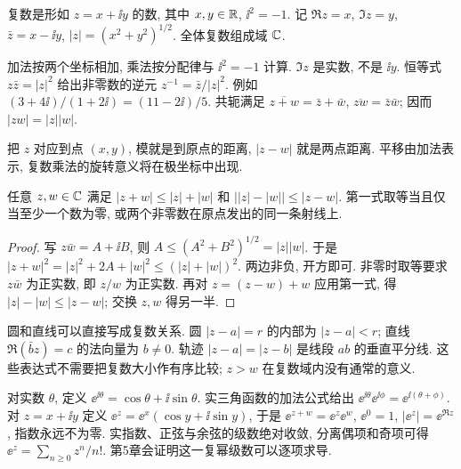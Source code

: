 \begin{definition}
复数是形如 $z=x+\ii y$ 的数, 其中 $x,y\in\mathbb R$, $\ii^2=-1$. 记 $\Re z=x$, $\Im z=y$, $\bar z=x-\ii y$, $|z|=(x^2+y^2)^{1/2}$. 全体复数组成域 $\mathbb C$.
\end{definition}
加法按两个坐标相加, 乘法按分配律与 $\ii^2=-1$ 计算. $\Im z$ 是实数, 不是 $\ii y$. 恒等式 $z\bar z=|z|^2$ 给出非零数的逆元 $z^{-1}=\bar z/|z|^2$. 例如 $(3+4\ii)/(1+2\ii)=(11-2\ii)/5$. 共轭满足 $\overline{z+w}=\bar z+\bar w$, $\overline{zw}=\bar z\bar w$; 因而 $|zw|=|z||w|$.

把 $z$ 对应到点 $(x,y)$, 模就是到原点的距离, $|z-w|$ 就是两点距离. 平移由加法表示, 复数乘法的旋转意义将在极坐标中出现.
\begin{proposition}[三角不等式]
任意 $z,w\in\mathbb C$ 满足 $|z+w|\le |z|+|w|$ 和 $\bigl||z|-|w|\bigr|\le |z-w|$. 第一式取等当且仅当至少一个数为零, 或两个非零数在原点发出的同一条射线上.
\end{proposition}
\begin{proof}
写 $z\bar w=A+\ii B$, 则 $A\le(A^2+B^2)^{1/2}=|z||w|$. 于是 $|z+w|^2=|z|^2+2A+|w|^2\le(|z|+|w|)^2$. 两边非负, 开方即可. 非零时取等要求 $z\bar w$ 为正实数, 即 $z/w$ 为正实数. 再对 $z=(z-w)+w$ 应用第一式, 得 $|z|-|w|\le|z-w|$; 交换 $z,w$ 得另一半.
\end{proof}
圆和直线可以直接写成复数关系. 圆 $|z-a|=r$ 的内部为 $|z-a|<r$; 直线 $\Re(\bar b z)=c$ 的法向量为 $b\ne0$. 轨迹 $|z-a|=|z-b|$ 是线段 $ab$ 的垂直平分线. 这些表达式不需要把复数大小作有序比较; $z>w$ 在复数域内没有通常的意义.

对实数 $\theta$, 定义 $\ee^{\ii\theta}=\cos\theta+\ii\sin\theta$. 实三角函数的加法公式给出 $\ee^{\ii\theta}\ee^{\ii\phi}=\ee^{\ii(\theta+\phi)}$. 对 $z=x+\ii y$ 定义 $\ee^z=\ee^x(\cos y+\ii\sin y)$, 于是 $\ee^{z+w}=\ee^z\ee^w$, $\ee^0=1$, $|\ee^z|=\ee^{\Re z}$, 指数永远不为零. 实指数、正弦与余弦的级数绝对收敛, 分离偶项和奇项可得 $\ee^z=\sum_{n\ge0}z^n/n!$. 第5章会证明这一复幂级数可以逐项求导.

